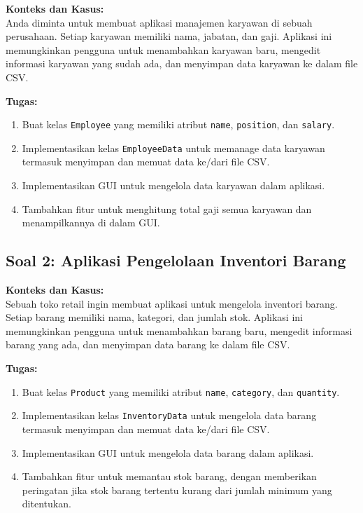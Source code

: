 \textbf{Konteks dan Kasus:} \\
Anda diminta untuk membuat aplikasi manajemen karyawan di sebuah perusahaan. Setiap karyawan memiliki nama, jabatan, dan gaji. Aplikasi ini memungkinkan pengguna untuk menambahkan karyawan baru, mengedit informasi karyawan yang sudah ada, dan menyimpan data karyawan ke dalam file CSV.

\textbf{Tugas:}
\begin{enumerate}
	\item Buat kelas \texttt{Employee} yang memiliki atribut \texttt{name}, \texttt{position}, dan \texttt{salary}.
	\item Implementasikan kelas \texttt{EmployeeData} untuk memanage data karyawan termasuk menyimpan dan memuat data ke/dari file CSV.
	\item Implementasikan GUI untuk mengelola data karyawan dalam aplikasi.
	\item Tambahkan fitur untuk menghitung total gaji semua karyawan dan menampilkannya di dalam GUI.
\end{enumerate}

\subsection*{Soal 2: Aplikasi Pengelolaan Inventori Barang}

\textbf{Konteks dan Kasus:} \\
Sebuah toko retail ingin membuat aplikasi untuk mengelola inventori barang. Setiap barang memiliki nama, kategori, dan jumlah stok. Aplikasi ini memungkinkan pengguna untuk menambahkan barang baru, mengedit informasi barang yang ada, dan menyimpan data barang ke dalam file CSV.

\textbf{Tugas:}
\begin{enumerate}
	\item Buat kelas \texttt{Product} yang memiliki atribut \texttt{name}, \texttt{category}, dan \texttt{quantity}.
	\item Implementasikan kelas \texttt{InventoryData} untuk mengelola data barang termasuk menyimpan dan memuat data ke/dari file CSV.
	\item Implementasikan GUI untuk mengelola data barang dalam aplikasi.
	\item Tambahkan fitur untuk memantau stok barang, dengan memberikan peringatan jika stok barang tertentu kurang dari jumlah minimum yang ditentukan.
\end{enumerate}